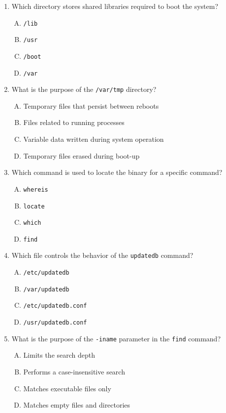 \documentclass[a4paper]{report}
\begin{document}
\begin{enumerate}[1.]
    \item Which directory stores shared libraries required to boot the system?  
    \begin{enumerate}[A)]
        \item \texttt{/lib}  
        \item \texttt{/usr}  
        \item \texttt{/boot}  
        \item \texttt{/var}  
    \end{enumerate}

    \item What is the purpose of the \texttt{/var/tmp} directory?  
    \begin{enumerate}[A)]
        \item Temporary files that persist between reboots  
        \item Files related to running processes  
        \item Variable data written during system operation  
        \item Temporary files erased during boot-up  
    \end{enumerate}

    \item Which command is used to locate the binary for a specific command?  
    \begin{enumerate}[A)]
        \item \texttt{whereis}  
        \item \texttt{locate}  
        \item \texttt{which}  
        \item \texttt{find}  
    \end{enumerate}

    \item Which file controls the behavior of the \texttt{updatedb} command?  
    \begin{enumerate}[A)]
        \item \texttt{/etc/updatedb}  
        \item \texttt{/var/updatedb}  
        \item \texttt{/etc/updatedb.conf}  
        \item \texttt{/usr/updatedb.conf}  
    \end{enumerate}

    \item What is the purpose of the \texttt{-iname} parameter in the \texttt{find} command?  
    \begin{enumerate}[A)]
        \item Limits the search depth  
        \item Performs a case-insensitive search  
        \item Matches executable files only  
        \item Matches empty files and directories  
    \end{enumerate}


\end{enumerate}
\end{document}
